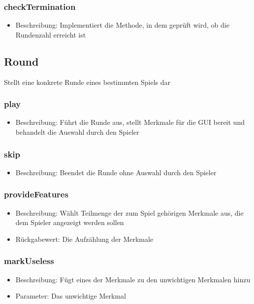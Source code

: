 \documentclass[a4paper]{scrreprt}
\begin{document}
   \subsubsection{checkTermination}
   \begin{itemize}
      \item Beschreibung: Implementiert die Methode, in dem geprüft wird, ob die Rundenzahl erreicht ist
   \end{itemize}
   
   \subsection{Round}
   Stellt eine konkrete Runde eines bestimmten Spiels dar
   \subsubsection{play}
   \begin{itemize}
   \item Beschreibung: Führt die Runde aus, stellt Merkmale für die GUI bereit und behandelt die Auswahl durch den Spieler
   \end{itemize}
   \subsubsection{skip}
      \begin{itemize}
      \item Beschreibung: Beendet die Runde ohne Auswahl durch den Spieler
      \end{itemize}
   \subsubsection{provideFeatures}
      \begin{itemize}
      \item Beschreibung: Wählt Teilmenge der zum Spiel gehörigen Merkmale aus, die dem Spieler angezeigt werden sollen
      \item Rückgabewert: Die Aufzählung der Merkmale
      \end{itemize}
   \subsubsection{markUseless}
      \begin{itemize}
      \item Beschreibung: Fügt eines der Merkmale zu den unwichtigen Merkmalen hinzu
      \item Parameter: Das unwichtige Merkmal
      \end{itemize}
\end{document}
